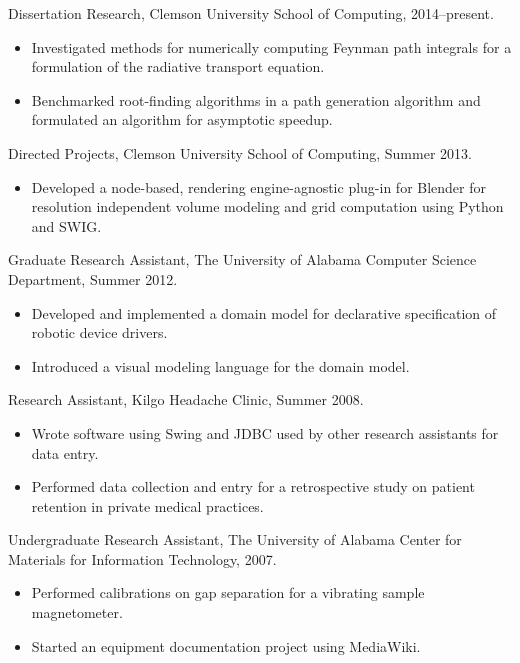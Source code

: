 Dissertation Research, Clemson University School of Computing, 2014--present.

\begin{itemize}
  \item Investigated methods for numerically computing Feynman path integrals
        for a formulation of the radiative transport equation.
  \item Benchmarked root-finding algorithms in a path generation algorithm and
        formulated an algorithm for asymptotic speedup.
\end{itemize}

Directed Projects, Clemson University School of Computing, Summer 2013.

\begin{itemize}
  \item Developed a node-based, rendering engine-agnostic plug-in for Blender
        for resolution independent volume modeling and grid computation using
        Python and SWIG.
\end{itemize}

Graduate Research Assistant, The University of Alabama Computer Science
Department, Summer 2012.

\begin{itemize}
  \item Developed and implemented a domain model for declarative specification
        of robotic device drivers.
  \item Introduced a visual modeling language for the domain model.
\end{itemize}

Research Assistant, Kilgo Headache Clinic, Summer 2008.

\begin{itemize}
  \item Wrote software using Swing and JDBC used by other research assistants
        for data entry.
  \item Performed data collection and entry for a retrospective study on
        patient retention in private medical practices.
\end{itemize}

Undergraduate Research Assistant, The University of Alabama Center for
Materials for Information Technology, 2007.

\begin{itemize}
  \item Performed calibrations on gap separation for a vibrating sample
        magnetometer.
  \item Started an equipment documentation project using MediaWiki.
\end{itemize}

